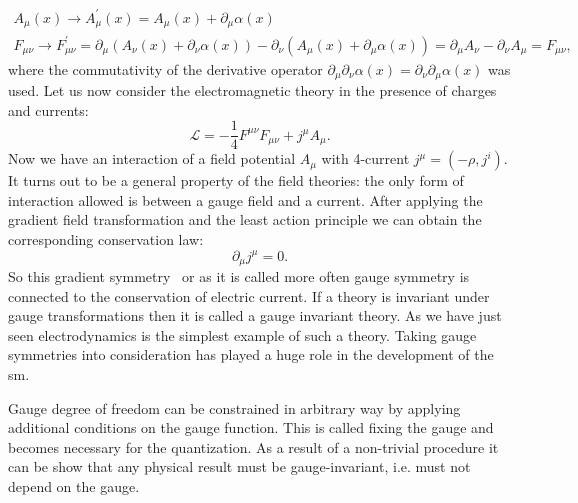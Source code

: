 \begin{equation}
\begin{array}{lcl} 
A_{\mu}(x) \rightarrow A^{\prime}_{\mu}(x)  = A_{\mu}(x)+\partial_{\mu}\alpha(x)  \\ 
F_{\mu \nu} \rightarrow F^{\prime}_{\mu \nu}  = \partial_{\mu}(A_{\nu}(x)+\partial_{\nu}\alpha(x))-\partial_{\nu}(A_{\mu}(x)+\partial_{\mu}\alpha(x))=\partial_{\mu}A_{\nu} - \partial_{\nu}A_{\mu}=F_{\mu \nu},
\end{array} 
\end{equation}
where the commutativity of the derivative operator $\partial_{\mu}\partial_{\nu}\alpha(x)=\partial_{\nu}\partial_{\mu}\alpha(x)$ was used.
Let us now consider the electromagnetic theory in the presence of charges and currents:
 \begin{equation}
\mathcal{L} = -\frac{1}{4} F^{\mu \nu}F_{\mu \nu} + j^{\mu}A_{\mu}.
\end{equation}
Now we have an interaction of a field potential $A_{\mu}$ with 4-current $j^{\mu}=(-\rho,j^{i})$. It turns out to be a general property of the field theories: the only form of interaction allowed is between a gauge field and a current.  After applying the gradient field transformation and the least action principle we can obtain the corresponding conservation law:
\begin{equation}
\partial_{\mu}j^{\mu}=0.
\end{equation}
 So this gradient symmetry~\cite{bogol} or as it is called more often gauge symmetry is connected to the conservation of electric current. If a theory is invariant under gauge transformations then it is called a gauge invariant theory. As we have just seen electrodynamics is the simplest example of such a theory. Taking gauge symmetries into consideration \cite{YangMills} has played a huge role in the development of the \gls{sm}.
 
 Gauge degree of freedom can be constrained in arbitrary way by applying additional conditions on the gauge function. This is called fixing the gauge and becomes necessary for the quantization. As a result of a non-trivial procedure it can be show that any physical result must be gauge-invariant, i.e. must not depend on the gauge. 

